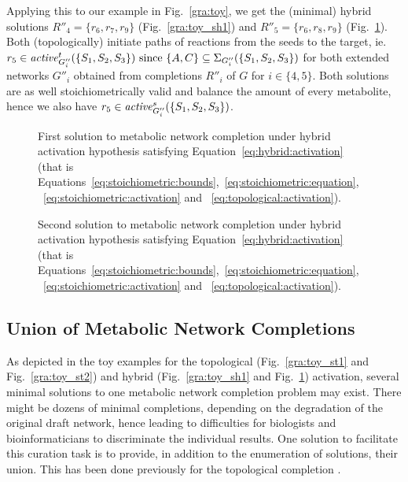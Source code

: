 Applying this to our example in Fig.~\ref{gra:toy},
we get the (minimal) hybrid solutions $R''_4=\{r_6,r_7,r_{9}\}$ (Fig.~\ref{gra:toy_sh1}) and $R''_5=\{r_6,r_8,r_{9}\}$ (Fig.~\ref{gra:toy_sh2}).
Both (topologically) initiate paths of reactions from the seeds to the target,
ie.\ $r_5\in\mathit{active}^{t}_{G''_i}(\{S_1,S_2,S_3\})\mbox{ since }\{A,C\}\subseteq\Sigma_{G''_i}(\{S_1,S_2,S_3\})$
for both extended networks $G''_i$ obtained from completions $R''_i$ of $G$ for $i\in\{4,5\}$.
Both solutions are as well stoichiometrically valid and balance the amount of every metabolite,
hence we also have $r_5\in\mathit{active}^{s}_{G''_i}(\{S_1,S_2,S_3\})$.

\begin{figure}
    \captionsetup{width=0.45\textwidth}
    \centering
    \begin{minipage}[t]{.50\textwidth}
      \centering
      
      \caption{First solution to metabolic network completion under hybrid activation hypothesis satisfying Equation~\eqref{eq:hybrid:activation} (that is Equations~\eqref{eq:stoichiometric:bounds},~\eqref{eq:stoichiometric:equation}, ~\eqref{eq:stoichiometric:activation} and ~\eqref{eq:topological:activation}).}
      \label{gra:toy_sh1}
    \end{minipage}%
    \begin{minipage}[t]{.50\textwidth}
      \centering
      
      \caption{Second solution to metabolic network completion under hybrid activation hypothesis satisfying Equation~\eqref{eq:hybrid:activation} (that is Equations~\eqref{eq:stoichiometric:bounds},~\eqref{eq:stoichiometric:equation}, ~\eqref{eq:stoichiometric:activation} and ~\eqref{eq:topological:activation}).}
      \label{gra:toy_sh2}
    \end{minipage}
\end{figure}

\subsection{Union of Metabolic Network Completions}\label{sec:union} %
As depicted in the toy examples for the topological (Fig.~\ref{gra:toy_st1} and Fig.~\ref{gra:toy_st2}) and hybrid (Fig.~\ref{gra:toy_sh1} and
Fig.~\ref{gra:toy_sh2}) activation, several minimal solutions to one metabolic network completion problem may exist.
There might be dozens of minimal completions, depending on the degradation of the original draft network,
hence leading to difficulties for biologists and bioinformaticians to discriminate the individual results.
One solution to facilitate this curation task is to provide, in addition to the enumeration of solutions, their union.
This has been done previously for the topological completion \citep{Prigent2017}.


